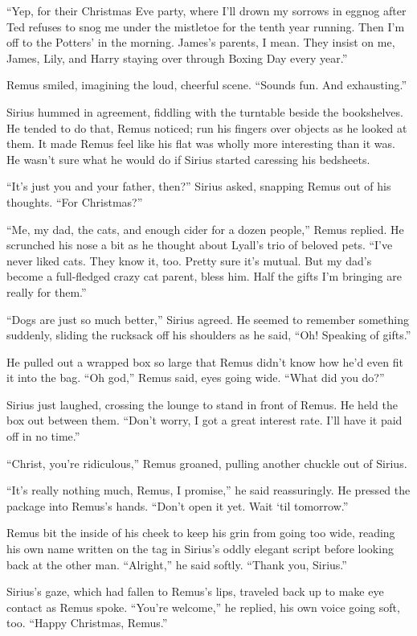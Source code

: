 “Yep, for their Christmas Eve party, where I’ll drown my sorrows in eggnog after Ted refuses to snog me under the mistletoe for the tenth year running. Then I’m off to the Potters’ in the morning. James’s parents, I mean. They insist on me, James, Lily, and Harry staying over through Boxing Day every year.”

Remus smiled, imagining the loud, cheerful scene. “Sounds fun. And exhausting.”

Sirius hummed in agreement, fiddling with the turntable beside the bookshelves. He tended to do that, Remus noticed; run his fingers over objects as he looked at them. It made Remus feel like his flat was wholly more interesting than it was. He wasn’t sure what he would do if Sirius started caressing his bedsheets.

“It’s just you and your father, then?” Sirius asked, snapping Remus out of his thoughts. “For Christmas?”

“Me, my dad, the cats, and enough cider for a dozen people,” Remus replied. He scrunched his nose a bit as he thought about Lyall’s trio of beloved pets. “I’ve never liked cats. They know it, too. Pretty sure it’s mutual. But my dad’s become a full-fledged crazy cat parent, bless him. Half the gifts I’m bringing are really for them.”

“Dogs are just so much better,” Sirius agreed. He seemed to remember something suddenly, sliding the rucksack off his shoulders as he said, “Oh! Speaking of gifts.”

He pulled out a wrapped box so large that Remus didn’t know how he’d even fit it into the bag. “Oh god,” Remus said, eyes going wide. “What did you do?”

Sirius just laughed, crossing the lounge to stand in front of Remus. He held the box out between them. “Don’t worry, I got a great interest rate. I’ll have it paid off in no time.”

“Christ, you’re ridiculous,” Remus groaned, pulling another chuckle out of Sirius.

“It’s really nothing much, Remus, I promise,” he said reassuringly. He pressed the package into Remus’s hands. “Don’t open it yet. Wait ‘til tomorrow.”

Remus bit the inside of his cheek to keep his grin from going too wide, reading his own name written on the tag in Sirius’s oddly elegant script before looking back at the other man. “Alright,” he said softly. “Thank you, Sirius.”

Sirius’s gaze, which had fallen to Remus’s lips, traveled back up to make eye contact as Remus spoke. “You’re welcome,” he replied, his own voice going soft, too. “Happy Christmas, Remus.”

